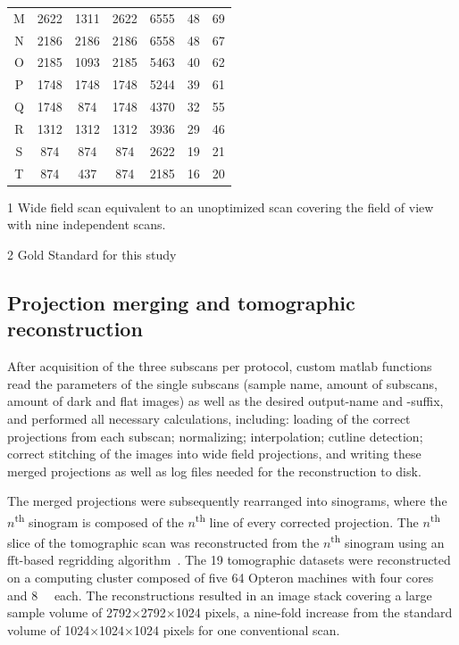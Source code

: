 {\begin{threeparttable}
\begin{tabular}{ccccccc}
		M & 2622 & 1311 & 2622 & 6555  & 48 & 69\\
		N & 2186 & 2186 & 2186 & 6558  & 48 & 67\\
		O & 2185 & 1093 & 2185 & 5463  & 40 & 62\\
		P & 1748 & 1748 & 1748 & 5244  & 39 & 61\\
		Q & 1748 & 874  & 1748 & 4370  & 32 & 55\\
		R & 1312 & 1312 & 1312 & 3936  & 29 & 46\\
		S & 874  & 874  & 874  & 2622  & 19 & 21\\
		\rowcolor{lightgray} T & 874 & 437 & 874 & 2185 & 16 & 20\\
		\bottomrule
	\end{tabular}
	\begin{tablenotes}
		\footnotesize
		\item[1] Wide field scan equivalent to an unoptimized scan covering the field of view with nine independent scans.
		\item[2] Gold Standard for this study
	\end{tablenotes}
\end{threeparttable}
}

\subsection[Projection merging \& tomographic reconstruction]{Projection merging and tomographic reconstruction}
After acquisition of the three subscans per protocol, custom \ac{matlab} functions read the parameters of the single subscans (\eg sample name, amount of subscans, amount of dark and flat images) as well as the desired output-name and -suffix, and performed all necessary calculations, including: loading of the correct projections from each subscan; normalizing; interpolation; cutline detection; correct stitching of the images into wide field projections, and writing these merged projections as well as log files needed for the reconstruction to disk.

The merged projections were subsequently rearranged into sinograms, where the $n$\textsuperscript{th} sinogram is composed of the $n$\textsuperscript{th} line of every corrected projection. The $n$\textsuperscript{th} slice of the tomographic scan was reconstructed from the $n$\textsuperscript{th} sinogram using an \acs{fft}-based regridding algorithm~\cite{Dowd1999,Marone2008}. The 19 tomographic datasets were reconstructed on a computing cluster composed of five \SI{64}{\bit} Opteron machines with four cores and \SI{8}{\giga\byte}  each. The reconstructions resulted in an image stack covering a large sample volume of 2792$\times$2792$\times$1024 pixels, a nine-fold increase from the standard volume of 1024$\times$1024$\times$1024 pixels for one conventional scan.

